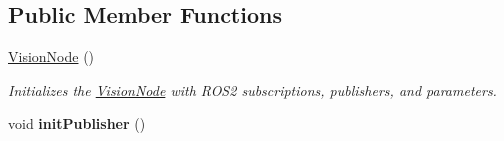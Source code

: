 \subsection*{Public Member Functions}
\begin{DoxyCompactItemize}
\item 
\hyperlink{classVisionNode_ac084d7f3ca8b99239b9215eacae6a3b3}{Vision\+Node} ()
\begin{DoxyCompactList}\small\item\em Initializes the \hyperlink{classVisionNode}{Vision\+Node} with R\+O\+S2 subscriptions, publishers, and parameters. \end{DoxyCompactList}\item 
\mbox{\label{classVisionNode_ab4d1d91b22f01874793337e9f3ae2083}} 
void {\bfseries init\+Publisher} ()
\end{DoxyCompactItemize}

